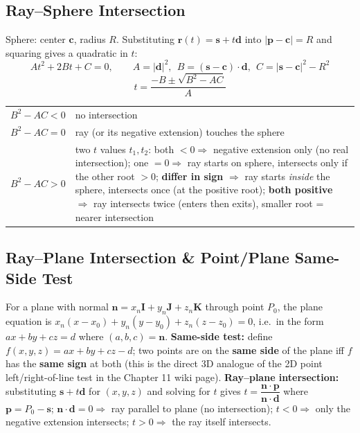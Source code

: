 \documentclass[12pt, a4paper]{article}
\newenvironment{answerbox}{\begin{mdframed}[style=answerframe]}{\end{mdframed}}
\begin{document}
\subsection{Ray--Sphere Intersection}
\begin{answerbox}
Sphere: center $\mathbf{c}$, radius $R$. Substituting $\mathbf{r}(t)=\mathbf{s}+t\mathbf{d}$ into $|\mathbf{p}-\mathbf{c}|=R$ and squaring gives a quadratic in $t$:
$$At^2+2Bt+C=0, \qquad A=|\mathbf{d}|^2,\ \ B=(\mathbf{s}-\mathbf{c})\cdot\mathbf{d},\ \ C=|\mathbf{s}-\mathbf{c}|^2-R^2$$
$$t = \frac{-B\pm\sqrt{B^2-AC}}{A}$$
\begin{center}
\begin{tabular}{p{2.6cm}p{9.8cm}}
\toprule
$B^2-AC<0$ & no intersection \\
$B^2-AC=0$ & ray (or its negative extension) touches the sphere \\
$B^2-AC>0$ & two $t$ values $t_1,t_2$: both $<0\Rightarrow$ negative extension only (no real intersection); one $=0\Rightarrow$ ray starts on sphere, intersects only if the other root $>0$; \textbf{differ in sign} $\Rightarrow$ ray starts \emph{inside} the sphere, intersects once (at the positive root); \textbf{both positive} $\Rightarrow$ ray intersects twice (enters then exits), smaller root = nearer intersection \\
\bottomrule
\end{tabular}
\end{center}
\end{answerbox}

\subsection{Ray--Plane Intersection \& Point/Plane Same-Side Test}
\begin{answerbox}
For a plane with normal $\mathbf{n}=x_n\mathbf{I}+y_n\mathbf{J}+z_n\mathbf{K}$ through point $P_0$, the plane equation is $x_n(x-x_0)+y_n(y-y_0)+z_n(z-z_0)=0$, i.e.\ in the form $ax+by+cz=d$ where $(a,b,c)=\mathbf{n}$. \textbf{Same-side test:} define $f(x,y,z)=ax+by+cz-d$; two points are on the \textbf{same side} of the plane iff $f$ has the \textbf{same sign} at both (this is the direct 3D analogue of the 2D point left/right-of-line test in the Chapter 11 wiki page).
\textbf{Ray--plane intersection:} substituting $\mathbf{s}+t\mathbf{d}$ for $(x,y,z)$ and solving for $t$ gives $t=\dfrac{\mathbf{n}\cdot\mathbf{p}}{\mathbf{n}\cdot\mathbf{d}}$ where $\mathbf{p}=P_0-\mathbf{s}$; $\mathbf{n}\cdot\mathbf{d}=0\Rightarrow$ ray parallel to plane (no intersection); $t<0\Rightarrow$ only the negative extension intersects; $t>0\Rightarrow$ the ray itself intersects.
\end{answerbox}
\end{document}
